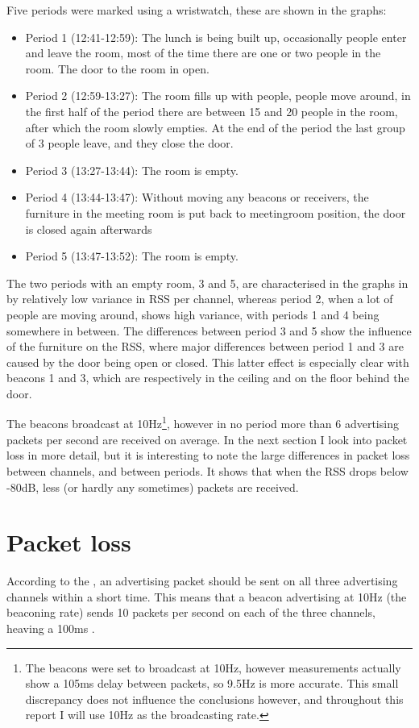 Five periods were marked using a wristwatch, these are shown in the graphs:
\begin{itemize}
    \item Period 1 (12:41-12:59): The lunch is being built up, occasionally people enter and leave the room, most of the time there are one or two people in the room.
        The door to the room in open.
    \item Period 2 (12:59-13:27): The room fills up with people, people move around, in the first half of the period there are between 15 and 20 people in the room, after which the room slowly empties.
        At the end of the period the last group of 3 people leave, and they close the door.
    \item Period 3 (13:27-13:44): The room is empty.
    \item Period 4 (13:44-13:47): Without moving any beacons or receivers, the furniture in the meeting room is put back to meetingroom position, the door is closed again afterwards
    \item Period 5 (13:47-13:52): The room is empty.
\end{itemize}

The two periods with an empty room, 3 and 5, are characterised in the graphs in  by relatively low variance in RSS per channel, whereas period 2, when a lot of people are moving around, shows high variance, with periods 1 and 4 being somewhere in between.
The differences between period 3 and 5 show the influence of the furniture on the RSS, where major differences between period 1 and 3 are caused by the door being open or closed.
This latter effect is especially clear with beacons 1 and 3, which are respectively in the ceiling and on the floor behind the door.

The beacons broadcast at 10Hz\footnote{The beacons were set to broadcast at 10Hz, however measurements actually show a 105ms delay between packets, so 9.5Hz is more accurate. This small discrepancy does not influence the conclusions however, and throughout this report I will use 10Hz as the broadcasting rate.}, however in no period more than 6 advertising packets per second are received on average.
In the next section I look into packet loss in more detail, but it is interesting to note the large differences in packet loss between channels, and between periods.
It shows that when the RSS drops below -80dB, less (or hardly any sometimes) packets are received.

\section{Packet loss}
\label{sec:rss-packet-loss}
According to the \BTspec, an advertising packet should be sent on all three advertising channels within a short time.
This means that a beacon advertising at 10Hz (the beaconing rate) sends 10 packets per second on each of the three channels, heaving a 100ms .

